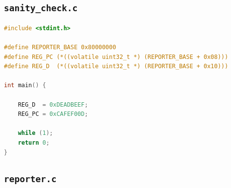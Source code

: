 \subsection{\texttt{sanity\_check.c}}
\label{ssec:codigo_sanity\_check}

\begin{lstlisting}[language=C, basicstyle=\ttfamily\footnotesize, caption={Código fuente completo de \texttt{sanity\_check.c}.}, label={code:sanity_check.c}]
#include <stdint.h>

#define REPORTER_BASE 0x80000000
#define REG_PC (*((volatile uint32_t *) (REPORTER_BASE + 0x08)))
#define REG_D  (*((volatile uint32_t *) (REPORTER_BASE + 0x10)))

int main() {
    
    REG_D  = 0xDEADBEEF;
    REG_PC = 0xCAFEF00D;

    while (1);
    return 0;
}
\end{lstlisting}

\subsection{\texttt{reporter.c}}
\label{ssec:codigo_reporter}

